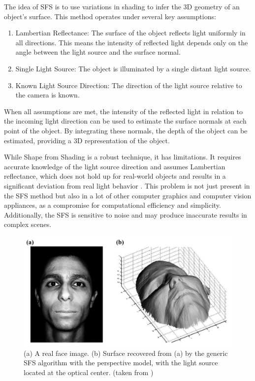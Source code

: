 The idea of SFS is to use variations in shading to infer the 3D geometry of an object's surface. This method operates under several key assumptions:

\begin{enumerate}
    \item Lambertian Reflectance: The surface of the object reflects light uniformly in all directions. This means the intensity of reflected light depends only on the angle between the light source and the surface normal.
    \item Single Light Source: The object is illuminated by a single distant light source.
    \item Known Light Source Direction: The direction of the light source relative to the camera is known.
\end{enumerate}

When all assumptions are met, the intensity of the reflected light in relation to the incoming light direction can be used to estimate the surface normals at each point of the object. By integrating these normals, the depth of the object can be estimated, providing a 3D representation of the object.

While Shape from Shading is a robust technique, it has limitations. It requires accurate knowledge of the light source direction and assumes Lambertian reflectance, which does not hold up for real-world objects and results in a significant deviation from real light behavior \autocite{wolff_generalizing_1996}.
This problem is not just present in the SFS method but also in a lot of other computer graphics and computer vision appliances, as a compromise for computational efficiency and simplicity.
Additionally, the SFS is sensitive to noise and may produce inaccurate results in complex scenes.


\begin{figure}
    \centering
    \includegraphics[width=0.9\linewidth]{images/shape_from_shading.jpg}
    \caption{(a) A real face image. (b) Surface recovered from (a) by the generic SFS algorithm with the perspective model, with the light source located at the optical center. (taken from \textcite{he_advances_2018})}
    \label{fig:shape_from_shading}
\end{figure}

